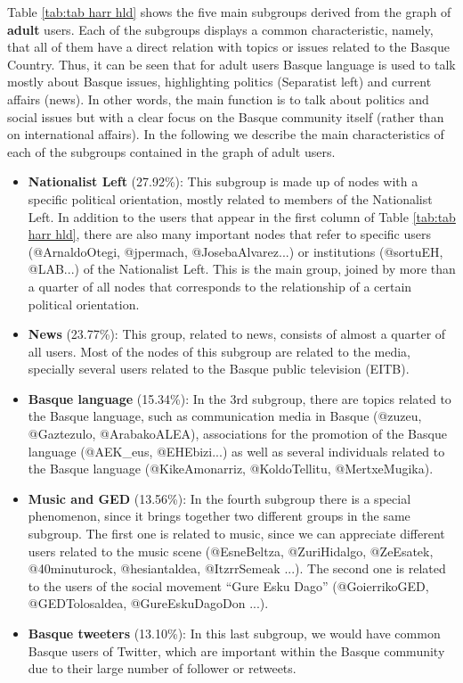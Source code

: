\documentclass[information,article,submit,moreauthors,pdftex,10pt,a4paper]{Definitions/mdpi}
\begin{document}
Table \ref{tab:tab harr hld} shows the five main subgroups derived from the graph of \textbf{adult} users. Each of the subgroups displays a common characteristic, namely, that all of them have a direct relation with topics or issues related to the Basque Country. Thus, it can be seen that for adult users Basque language is used to talk mostly about Basque issues, highlighting politics (Separatist left) and current affairs (news). In other words, the main function is to talk about politics and social issues but with a clear focus on the Basque community itself (rather than on international affairs). In the following we describe the main characteristics of each of the subgroups contained in the graph of adult users.

\begin{itemize}

\item \textbf{Nationalist Left} (27.92\%): This subgroup is made up of nodes with a specific political orientation, mostly related to members of the Nationalist Left. In addition to the users that appear in the first column of Table \ref{tab:tab harr hld}, there are also many important nodes that refer to specific users (@ArnaldoOtegi, @jpermach, @JosebaAlvarez...) or institutions (@sortuEH, @LAB...) of the Nationalist Left. This is the main group, joined by more than a quarter of all nodes that corresponds to the relationship of a certain political orientation.

\item \textbf{News} (23.77\%): This group, related to news, consists of almost a quarter of all users. Most of the nodes of this subgroup are related to the media, specially several users related to the Basque public television (EITB).

\item \textbf{Basque language} (15.34\%): In the 3rd subgroup, there are topics related to the Basque language, such as communication media in Basque (@zuzeu, @Gaztezulo, @ArabakoALEA), associations for the promotion of the Basque language (@AEK\_eus, @EHEbizi...) as well as several individuals related to the Basque language (@KikeAmonarriz, @KoldoTellitu, @MertxeMugika).

\item \textbf{Music and GED} (13.56\%): In the fourth subgroup there is a special phenomenon, since it brings together two different groups in the same subgroup. The first one is related to music, since we can appreciate different users related to the music scene (@EsneBeltza, @ZuriHidalgo, @ZeEsatek, @40minuturock, @hesiantaldea, @ItzrrSemeak ...). The second one is related to the users of the social movement ``Gure Esku Dago'' (@GoierrikoGED, @GEDTolosaldea, @GureEskuDagoDon ...).

\item \textbf{Basque tweeters} (13.10\%): In this last subgroup, we would have common Basque users of Twitter, which are important within the Basque community due to their large number of follower or retweets.
\end{itemize}
\end{document}
